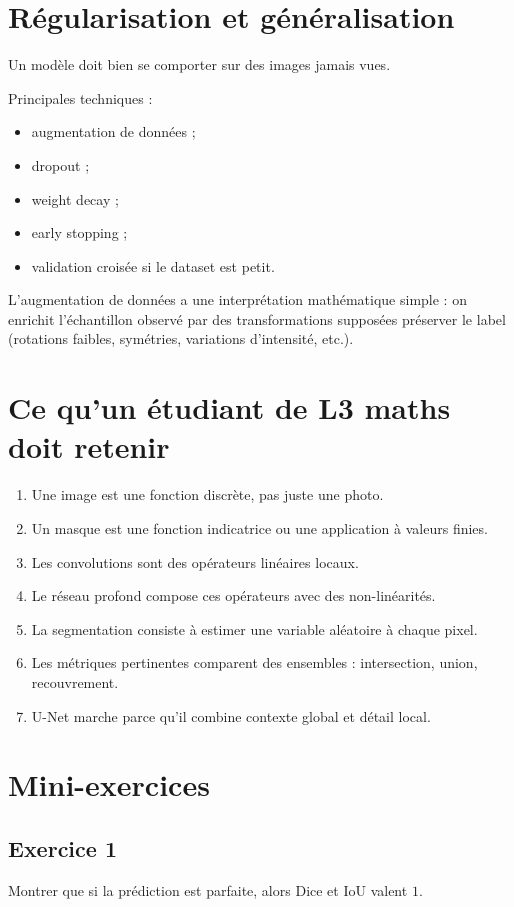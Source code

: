 \documentclass[11pt]{article}
\begin{document}
\section{Régularisation et généralisation}
Un modèle doit bien se comporter sur des images jamais vues.

Principales techniques :
\begin{itemize}
  \item augmentation de données ;
  \item dropout ;
  \item weight decay ;
  \item early stopping ;
  \item validation croisée si le dataset est petit.
\end{itemize}

L'augmentation de données a une interprétation mathématique simple : on enrichit l'échantillon observé par des transformations supposées préserver le label (rotations faibles, symétries, variations d'intensité, etc.).

\section{Ce qu'un étudiant de L3 maths doit retenir}
\begin{enumerate}[label=\arabic*)]
  \item Une image est une fonction discrète, pas juste une photo.
  \item Un masque est une fonction indicatrice ou une application à valeurs finies.
  \item Les convolutions sont des opérateurs linéaires locaux.
  \item Le réseau profond compose ces opérateurs avec des non-linéarités.
  \item La segmentation consiste à estimer une variable aléatoire à chaque pixel.
  \item Les métriques pertinentes comparent des ensembles : intersection, union, recouvrement.
  \item U-Net marche parce qu'il combine contexte global et détail local.
\end{enumerate}

\section{Mini-exercices}
\subsection*{Exercice 1}
Montrer que si la prédiction est parfaite, alors Dice et IoU valent $1$.
\end{document}
